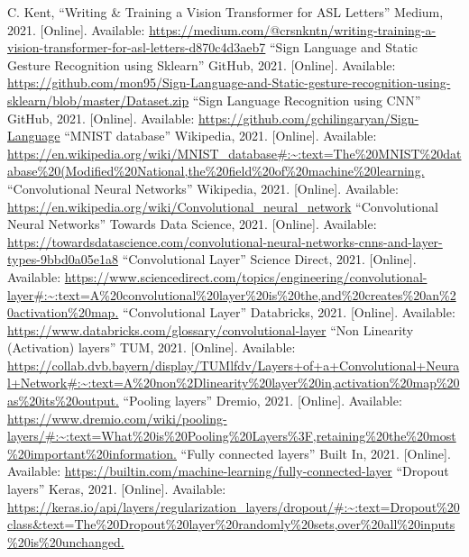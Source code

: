 \documentclass[../paper.tex]{subfiles}
\begin{document}
\begin{thebibliography}{00}
         C. Kent, ``Writing & Training a Vision Transformer for ASL Letters'' Medium, 2021.
        [Online].
        Available: \url{https://medium.com/@crsnkntn/writing-training-a-vision-transformer-for-asl-letters-d870c4d3aeb7}
         ``Sign Language and Static Gesture Recognition using Sklearn'' GitHub, 2021.
        [Online].
        Available: \url{https://github.com/mon95/Sign-Language-and-Static-gesture-recognition-using-sklearn/blob/master/Dataset.zip}
         ``Sign Language Recognition using CNN'' GitHub, 2021.
        [Online].
        Available: \url{https://github.com/gchilingaryan/Sign-Language}
         ``MNIST database'' Wikipedia, 2021.
        [Online].
        Available: \url{https://en.wikipedia.org/wiki/MNIST_database#:~:text=The%20MNIST%20database%20(Modified%20National,the%20field%20of%20machine%20learning.}
         ``Convolutional Neural Networks'' Wikipedia, 2021.
        [Online].
        Available: \url{https://en.wikipedia.org/wiki/Convolutional_neural_network}
         ``Convolutional Neural Networks'' Towards Data Science, 2021.
        [Online].
        Available: \url{https://towardsdatascience.com/convolutional-neural-networks-cnns-and-layer-types-9bbd0a05e1a8}
         ``Convolutional Layer'' Science Direct, 2021.
        [Online].
        Available: \url{https://www.sciencedirect.com/topics/engineering/convolutional-layer#:~:text=A%20convolutional%20layer%20is%20the,and%20creates%20an%20activation%20map.}
         ``Convolutional Layer'' Databricks, 2021.
        [Online].
        Available: \url{https://www.databricks.com/glossary/convolutional-layer}
         ``Non Linearity (Activation) layers'' TUM, 2021.
        [Online].
        Available: \url{https://collab.dvb.bayern/display/TUMlfdv/Layers+of+a+Convolutional+Neural+Network#:~:text=A%20non%2Dlinearity%20layer%20in,activation%20map%20as%20its%20output.}
         ``Pooling layers'' Dremio, 2021.
        [Online].
        Available: \url{https://www.dremio.com/wiki/pooling-layers/#:~:text=What%20is%20Pooling%20Layers%3F,retaining%20the%20most%20important%20information.}
         ``Fully connected layers'' Built In, 2021.
        [Online].
        Available: \url{https://builtin.com/machine-learning/fully-connected-layer}
         ``Dropout layers'' Keras, 2021.
        [Online].
        Available: \url{https://keras.io/api/layers/regularization_layers/dropout/#:~:text=Dropout%20class&text=The%20Dropout%20layer%20randomly%20sets,over%20all%20inputs%20is%20unchanged.}

\end{thebibliography}
\end{document}
